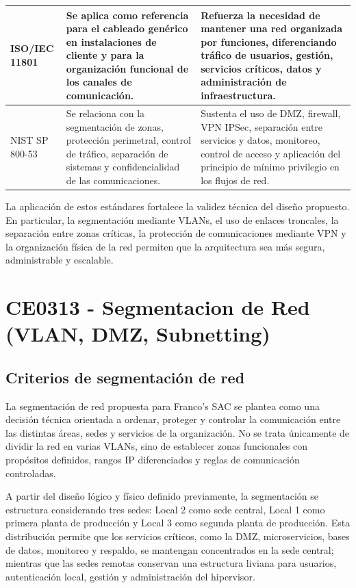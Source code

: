 \documentclass[11pt, a4paper, oneside]{report}
\begin{document}
\begin{xltabular}{\textwidth}{@{}|L{3cm}|X|X|@{}}
{\small ISO/IEC 11801} &
{\small Se aplica como referencia para el cableado genérico en instalaciones de cliente y para la organización funcional de los canales de comunicación.} &
{\small Refuerza la necesidad de mantener una red organizada por funciones, diferenciando tráfico de usuarios, gestión, servicios críticos, datos y administración de infraestructura.} \\ \hline

{\small NIST SP 800-53} &
{\small Se relaciona con la segmentación de zonas, protección perimetral, control de tráfico, separación de sistemas y confidencialidad de las comunicaciones.} &
{\small Sustenta el uso de DMZ, firewall, VPN IPSec, separación entre servicios y datos, monitoreo, control de acceso y aplicación del principio de mínimo privilegio en los flujos de red.} \\ \hline

\end{xltabular}

\normalsize

La aplicación de estos estándares fortalece la validez técnica del diseño propuesto. En particular, la segmentación mediante VLANs, el uso de enlaces troncales, la separación entre zonas críticas, la protección de comunicaciones mediante VPN y la organización física de la red permiten que la arquitectura sea más segura, administrable y escalable.


\chapter{CE0313 - Segmentacion de Red (VLAN, DMZ, Subnetting)}

\section{Criterios de segmentación de red}

La segmentación de red propuesta para Franco's SAC se plantea como una decisión técnica orientada a ordenar, proteger y controlar la comunicación entre las distintas áreas, sedes y servicios de la organización. No se trata únicamente de dividir la red en varias VLANs, sino de establecer zonas funcionales con propósitos definidos, rangos IP diferenciados y reglas de comunicación controladas.

A partir del diseño lógico y físico definido previamente, la segmentación se estructura considerando tres sedes: Local 2 como sede central, Local 1 como primera planta de producción y Local 3 como segunda planta de producción. Esta distribución permite que los servicios críticos, como la DMZ, microservicios, bases de datos, monitoreo y respaldo, se mantengan concentrados en la sede central; mientras que las sedes remotas conservan una estructura liviana para usuarios, autenticación local, gestión y administración del hipervisor.
\end{document}
